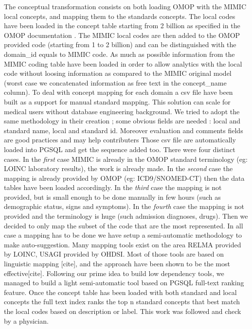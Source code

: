 The conceptual transformation consists on both loading OMOP with the MIMIC
local concepts, and mapping them to the standards concepts. 
The local codes have been loaded in the concept table starting from 2 billion
as specified in the OMOP documentation \cite{omop-documentation-pdf}. The
MIMIC local codes are then added to the OMOP provided code (starting from 1 to
2 billion) and can be distinguished with the domain\_id equals to MIMIC code. As
much as possible information from the MIMIC coding table have been loaded in
order to allow analytics with the local code without loosing information as
compared to the MIMIC original model (worst case we concatenated information as
free text in the concept\_name column).
To deal with concept mapping for each domain a csv file have been built as a
support for manual standard mapping. This solution can scale for medical users
without database engineering background. We tried to adopt the same methodology
in their creation ; some obvious fields are needed : local and standard name,
local and standard id. Moreover evaluation and comments fields are good
practices and may help contributers Those csv file are automatically loaded
into PGSQL and get the sequence added too. There were four distinct cases.  In the
\emph{first} case MIMIC is already in the OMOP standard terminology (eg: LOINC
laboratory results), the work is already made.  In the \emph{second} case the
mapping is already provided by OMOP (eg: ICD9/SNOMED-CT) then the data tables
have been loaded accordingly.  In the \emph{third} case the mapping is not
provided, but is small enough to be done manually in few hours (such as
demographic status, signs and symptoms).  In the \emph{fourth} case the mapping
is not provided and the terminology is huge (such admission diagnoses, drugs).
Then we decided to only map the subset of the code that are the most
represented.
In all case a mapping has to be done we have setup a semi-automatic methodology
to make auto-suggestion. Many mapping tools exist on the area RELMA provided by
LOINC, USAGI provided by OHDSI. Most of those tools are based on linguistic
mapping [cite], and the approach have been shown to be the most
effective[cite]. Following our prime idea to build low dependency tools, we
managed to build a light semi-automatic tool based on PGSQL full-text ranking
feature.  Once the concept table has been loaded with both standard and local
concepts the full text index ranks the top n standard concepts that best match
the local codes based on description or label.  This work was followed and
check by a physician.

